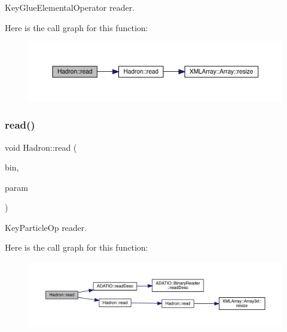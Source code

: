 Key\+Glue\+Elemental\+Operator reader. 

Here is the call graph for this function\+:
\nopagebreak
\begin{figure}[H]
\begin{center}
\leavevmode
\includegraphics[width=350pt]{d1/daf/namespaceHadron_a008c27a4777be30324acc6271e059d2e_cgraph}
\end{center}
\end{figure}
\mbox{\label{namespaceHadron_a22ce4d5ec6f9bf7a3504cb4b7b176c78}} 
\subsubsection{\texorpdfstring{read()}{read()}\hspace{0.1cm}{\footnotesize\ttfamily [49/94]}}
{\footnotesize\ttfamily void Hadron\+::read (\begin{DoxyParamCaption}\item[{\mbox{\hyperlink{classADATIO_1_1BinaryReader}{Binary\+Reader}} \&}]{bin,  }\item[{\mbox{\hyperlink{structHadron_1_1KeyParticleOp__t}{Key\+Particle\+Op\+\_\+t}} \&}]{param }\end{DoxyParamCaption})}



Key\+Particle\+Op reader. 

Here is the call graph for this function\+:
\nopagebreak
\begin{figure}[H]
\begin{center}
\leavevmode
\includegraphics[width=350pt]{d1/daf/namespaceHadron_a22ce4d5ec6f9bf7a3504cb4b7b176c78_cgraph}
\end{center}
\end{figure}
\mbox{\label{namespaceHadron_a48b9ff1049a4c339c032065b538ed41f}} 

